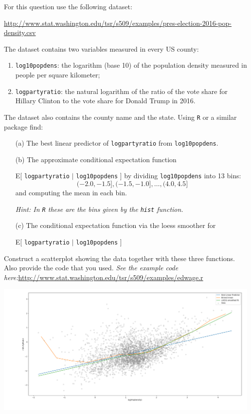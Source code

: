 \documentclass{article}
\newcommand{\1}{\mathbf{1}}
\begin{document}
For this question use the following dataset:\par
{\scriptsize \url{http://www.stat.washington.edu/tsr/s509/examples/pres-election-2016-pop-density.csv}}\par
The dataset contains two variables measured in every US county:
\begin{enumerate}
    \item {\tt log10popdens}: the logarithm (base 10) of the population density measured in people per square kilometer;
    \item{\tt logpartyratio}: the natural logarithm of the ratio of the vote share for Hillary Clinton to the vote share for Donald Trump in 2016.
\end{enumerate}
The dataset also contains the county name and the state. Using {\tt R} or a similar package find:
\begin{enumerate}
    \item[(a)] The best linear predictor of {\tt logpartyratio} from  {\tt log10popdens}.
    \item[(b)] The approximate conditional expectation function\par
        E[ {\tt logpartyratio} $|$ {\tt log10popdens} ] by dividing {\tt log10popdens} into 13 bins:
        $$(-2.0,-1.5], (-1.5,-1.0], \ldots ,(4.0,4.5]$$
        and computing the mean in each bin.\par
        {\it Hint: In {\tt R} these are the bins given by the {\tt hist} function.}
    \item[(c)] The conditional expectation function via the loess smoother for\par
        E[ {\tt logpartyratio} $|$ {\tt log10popdens} ]
\end{enumerate}
Construct a scatterplot showing the data together with these three functions. Also provide the code that you used. {\it  See the example code here:}\url{http://www.stat.washington.edu/tsr/s509/examples/edwage.r}

\begin{center}
\includegraphics[width=500px]{STATS509/HW5/problem5.png}
\end{center}
\end{document}
